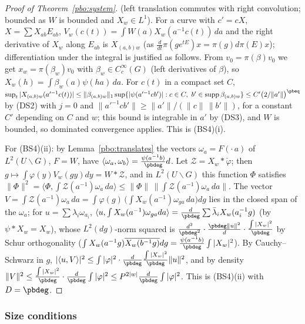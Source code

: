 \documentclass[10pt]{amsart}
\theoremstyle{definition}
\theoremstyle{remark}
\providecommand{\aubar}[1]{\overline{#1}}
\begin{document}
\begin{proof}[Proof of Theorem~\ref{pbo:system}]
(left translation commutes with right convolution; bounded as $W$ is bounded and $X_w\in L^1$). For a curve
with $c'=cX$, $X=\sum X_{ab}E_{ab}$, $V_w(c(t))=\int W(a)X_w(a^{-1}c(t))\,da$ and the right derivative of
$X_w$ along $E_{ab}$ is $X_{(a,b)w}$ (as $\frac d{dt}\pi(ge^{tE})x=\pi(g)d\pi(E)x$); differentiation under the
integral is justified as follows. From $v_0=\pi(\beta)v_0$ we get $x_w=\pi(\beta_w)v_0$ with $\beta_w\in
C^\infty_c(G)$ (left derivatives of $\beta$), so $X_w(h)=\int\beta_w(a)\psi(ha)\,da$. For $c(t)$ in a compact
set $C$, $\sup_t|X_{(a,b)w}(a'^{-1}c(t))|\le\|\beta_{(a,b)w}\|_1\sup\{|\psi(a'^{-1}cb')|:c\in C,\ b'\in
\operatorname{supp}\beta_{(a,b)w}\}\le C'\bigl(2/\|a'\|\bigr)^{\pbeq}$ by \textup{(DS2)} with $j=0$ and
$\|a'^{-1}cb'\|\ge\|a'\|/(\|c\|\,\|b'\|)$, for a constant $C'$ depending on $C$ and $w$; this bound is
integrable in $a'$ by \textup{(DS3)}, and $W$ is bounded, so dominated convergence applies. This is
(BS4)(i).

For (BS4)(ii): by Lemma~\ref{pbo:translates} the vectors $\omega_a=F(\cdot\,a)$ of $L^2(U\backslash G)$, $F=W$, have
$\langle\omega_a,\omega_b\rangle=\frac{\psi(a^{-1}b)}{\pbdeg}d$. Let $\mathcal Z=X_w*\check\varphi$; then $g\mapsto\int\varphi(y)
V_w(gy)dy=W*\mathcal Z$, and in $L^2(U\backslash G)$ this function $\Phi$ satisfies $\|\Phi\|^2=\langle\Phi,\int
\mathcal Z(a^{-1})\omega_a\,da\rangle\le\|\Phi\|\,\|\int\mathcal Z(a^{-1})\omega_a\,da\|$. The vector $V=\int
\mathcal Z(a^{-1})\omega_a\,da=\int\varphi(g)\,\Big(\int X_w(a^{-1})\omega_{ga}\,da\Big)dg$ lies in the closed span of the
$\omega_a$; for $u=\sum\lambda_i\omega_{a_i}$, $\langle u,\int X_w(a^{-1})\omega_{ga}da\rangle=\frac d{\pbdeg}\sum\bar\lambda_iX_w(a_i^{-1}g)$
(by $\psi*X_w=X_w$), whose $L^2(dg)$-norm squared is $\frac{d^2}{\pbdeg^2}\cdot\frac{\pbdeg\|u\|^2}{d}\cdot\frac{\int|X_w|^2}{\pbdeg}$
by Schur orthogonality ($\int X_w(a^{-1}g)\aubar{X_w(b^{-1}g)}dg=\frac{\psi(a^{-1}b)}{\pbdeg}\int|X_w|^2$). By
Cauchy--Schwarz in $g$, $|\langle u,V\rangle|^2\le\int|\varphi|^2\cdot\frac{d}{\pbdeg}\frac{\int|X_w|^2}{\pbdeg}\|u\|^2$, and by
density $\|V\|^2\le\frac{\int|X_w|^2}{\pbdeg}\cdot\frac d{\pbdeg}\int|\varphi|^2\le P^{2|w|}\frac d{\pbdeg}\int|\varphi|^2$.
This is (BS4)(ii) with $D=\pbdeg$.
\end{proof}

\subsubsection{Size conditions}\label{pbo:ss-sizes}
\end{document}
